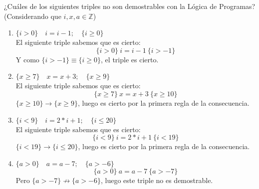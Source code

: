 \begin{ejercicio}
    ¿Cuáles de los siguientes triples no son demostrables con la Lógica de Programas?
    (Considerando que $i,x,a \in \mathbb{Z}$)
    \begin{enumerate}
        \item $\{i > 0\} \quad i = i - 1; \quad \{i \geq 0\}$\\
            El siguiente triple sabemos que es cierto:
            \begin{equation*}
                \{i>0\}\ i=i-1\ \{i>-1\} 
            \end{equation*}
            Y como $\{i>-1\}\equiv \{i\geq 0\}$, el triple es cierto.
        \item $\{x \geq 7\} \quad x = x + 3; \quad \{x \geq 9\}$\\
            El siguiente triple sabemos que es cierto:    
            \begin{equation*}
                \{x\geq 7\}\ x=x+3\ \{x\geq 10\}
            \end{equation*}
            $\{x\geq 10\}\rightarrow\{x\geq 9\}$, luego es cierto por la primera regla de la consecuencia.
        \item $\{i < 9\} \quad i = 2 \ast i + 1; \quad \{ i \leq 20\}$\\
            El siguiente triple sabemos que es cierto:
            \begin{equation*}
                \{i<9\}\ i=2\ast i+1\ \{i<19\}
            \end{equation*}
            $\{i<19\}\rightarrow\{i\leq 20\}$, luego es cierto por la primera regla de la consecuencia.
        \item $\{a > 0\} \quad a = a - 7; \quad \{a > -6\}$\\
            \begin{equation*}
                \{a>0\}\ a=a-7\ \{a>-7\}
            \end{equation*}
            Pero $\{a>-7\}\not\rightarrow\{a>-6\}$, luego este triple no es demostrable.
    \end{enumerate}
\end{ejercicio}

